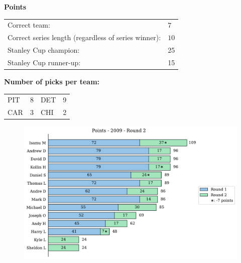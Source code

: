 \documentclass[10pt]{article}
\begin{document}
{\bf Points}\\
\begin{minipage}{12cm}
    \begin{tabular}{l l}
        Correct team:	& $7$\\
        Correct series length (regardless of series winner):	& $10$\\
        Stanley Cup champion:	& 25\\
        Stanley Cup runner-up:	& 15\\
    \end{tabular}

    \vspace{1cm}
    {\bf Number of picks per team:}\\
    \begin{tabular}{lc | lc }
        PIT & 8 & DET & 9 \\
        CAR & 3 & CHI & 2 \\
    \end{tabular}
\end{minipage}
\begin{minipage}[t]{13cm}
    \begin{figure}[H]
        \vspace{-2.5cm}
        \includegraphics[width=13cm]{../../figures/2009/Points-2009-Round2.pdf}
    \end{figure}
\end{minipage}
\end{document}

